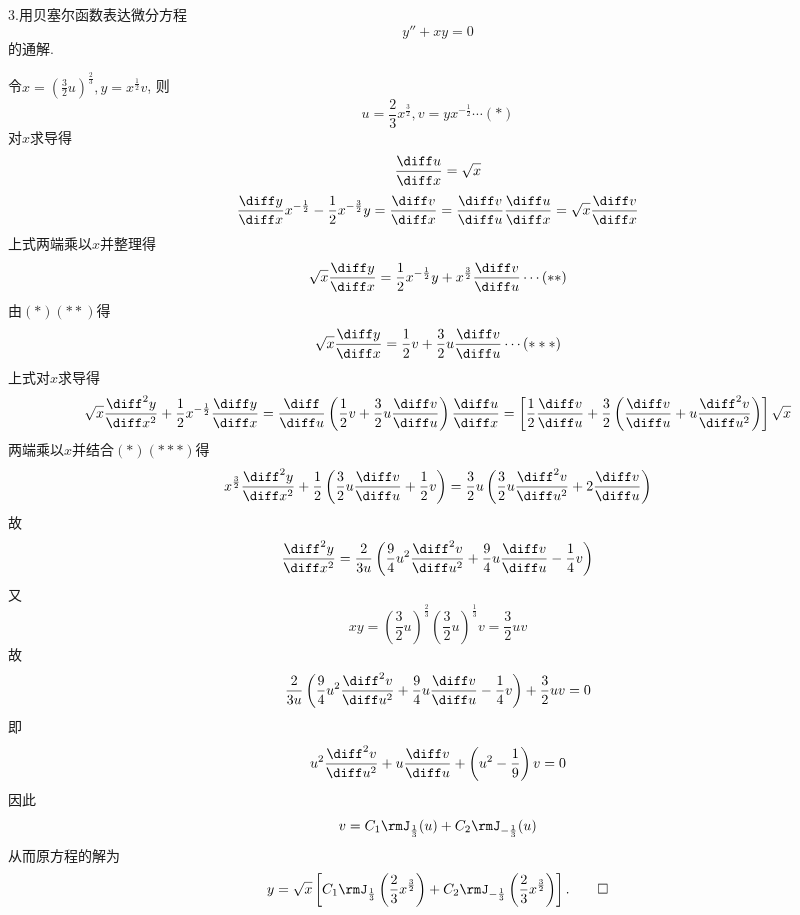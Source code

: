 3.用贝塞尔函数表达微分方程
\[y''+xy=0\]
的通解.

\begin{solve} 令$x=\left(\frac{3}{2}u\right)^{\frac{2}{3}},y=x^{\frac{1}{2}}v$, 则
\[u=\frac{2}{3}x^{\frac{3}{2}},v=yx^{-\frac{1}{2}}\cdots(*)\]
对$x$求导得
\[\frac{\diff u}{\diff x}=\sqrt{x}\]
\[\frac{\diff y}{\diff x}x^{-\frac{1}{2}}-\frac{1}{2}x^{-\frac{3}{2}}y=\frac{\diff v}{\diff x}=\frac{\diff v}{\diff u}\frac{\diff u}{\diff x}=\sqrt{x}\frac{\diff v}{\diff x}\]
上式两端乘以$x$并整理得
\[\sqrt{x}\frac{\diff y}{\diff x}=\frac{1}{2}x^{-\frac{1}{2}}y+x^{\frac{3}{2}}\frac{\diff v}{\diff u}\cdots(**)\]
由$(*)(**)$得
\[\sqrt{x}\frac{\diff y}{\diff x}=\frac{1}{2}v+\frac{3}{2}u\frac{\diff v}{\diff u}\cdots(***)\]
上式对$x$求导得
\[\sqrt{x}\frac{\diff^2y}{\diff x^2}+\frac{1}{2}x^{-\frac{1}{2}}\frac{\diff y}{\diff x}=\frac{\diff}{\diff u}\left(\frac{1}{2}v+\frac{3}{2}u\frac{\diff v}{\diff u}\right)\frac{\diff u}{\diff x}=\left[\frac{1}{2}\frac{\diff v}{\diff u}+\frac{3}{2}\left(\frac{\diff v}{\diff u}+u\frac{\diff^2v}{\diff u^2}\right)\right]\sqrt{x}\]
两端乘以$x$并结合$(*)(***)$得
\[x^{\frac{3}{2}}\frac{\diff^2y}{\diff x^2}+\frac{1}{2}\left(\frac{3}{2}u\frac{\diff v}{\diff u}+\frac{1}{2}v\right)=\frac{3}{2}u\left(\frac{3}{2}u\frac{\diff^2v}{\diff u^2}+2\frac{\diff v}{\diff u}\right)\]
故
\[\frac{\diff^2y}{\diff x^2}=\frac{2}{3u}\left(\frac{9}{4}u^2\frac{\diff^2v}{\diff u^2}+\frac{9}{4}u\frac{\diff v}{\diff u}-\frac{1}{4}v\right)\]
又\[xy=\left(\frac{3}{2}u\right)^{\frac{2}{3}}\left(\frac{3}{2}u\right)^{\frac{1}{3}}v=\frac{3}{2}uv\]
故
\[\frac{2}{3u}\left(\frac{9}{4}u^2\frac{\diff^2v}{\diff u^2}+\frac{9}{4}u\frac{\diff v}{\diff u}-\frac{1}{4}v\right)+\frac{3}{2}uv=0\]
即
\[u^2\frac{\diff^2v}{\diff u^2}+u\frac{\diff v}{\diff u}+\left(u^2-\frac{1}{9}\right)v=0\]
因此
\[v=C_1\rmJ_{\frac{1}{3}}(u)+C_2\rmJ_{-\frac{1}{3}}(u)\]
从而原方程的解为
\[y=\sqrt{x}\left[C_1\rmJ_{\frac{1}{3}}\left(\frac{2}{3}x^{\frac{3}{2}}\right)+C_2\rmJ_{-\frac{1}{3}}\left(\frac{2}{3}x^{\frac{3}{2}}\right)\right].\qedhere\]
\end{solve}